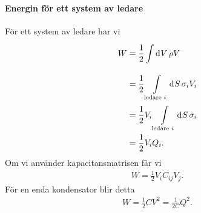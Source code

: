 \paragraph{Energin för ett system av ledare}
För ett system av ledare har vi
\begin{align*}
	W &= \frac{1}{2}\int\limits_{}^{}\dd[]{V}\rho V \\
	  &= \frac{1}{2}\int\limits_{\text{ledare }i}^{}\dd[]{S}\sigma_{i}V_{i} \\
	  &= \frac{1}{2}V_{i}\int\limits_{\text{ledare }i}^{}\dd[]{S}\sigma_{i} \\
	  &= \frac{1}{2}V_{i}Q_{i}.
\end{align*}
Om vi använder kapacitansmatrisen får vi
\begin{align*}
	W = \frac{1}{2}V_{i}C_{ij}V_{j}.
\end{align*}
För en enda kondensator blir detta
\begin{align*}
	W = \frac{1}{2}CV^{2} = \frac{1}{2C}Q^{2}.
\end{align*}